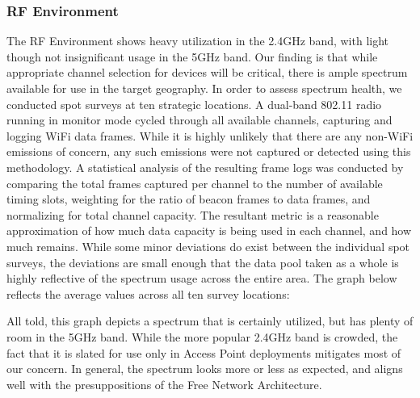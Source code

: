 \subsubsection{RF Environment}
The RF Environment shows heavy utilization in the 2.4GHz band, with light though
not insignificant usage in the 5GHz band. Our finding is that while appropriate
channel selection for devices will be critical, there is ample spectrum
available for use in the target geography. In order to assess spectrum health,
we conducted spot surveys at ten strategic locations. A dual-band 802.11 radio
running in monitor mode cycled through all available channels, capturing and
logging WiFi data frames. While it is highly unlikely that there are any non-WiFi
emissions of concern, any such emissions were not captured or detected using
this methodology. A statistical analysis of the resulting frame logs was conducted
by comparing the total frames captured per channel to the number of available
timing slots, weighting for the ratio of beacon frames to data frames, and
normalizing for total channel capacity. The resultant metric is a reasonable
approximation of how much data capacity is being used in each channel, and how
much remains. While some minor deviations do exist
between the individual spot surveys, the deviations are small enough that the
data pool taken as a whole is highly reflective of the spectrum usage across
the entire area. The graph below reflects the average values across all ten
survey locations: \par
\begin{center}
\end{center}
All told, this graph depicts a spectrum that is certainly utilized, but has plenty of room
in the 5GHz band. While the more popular 2.4GHz band is crowded, the fact that
it is slated for use only in Access Point deployments mitigates most of our
concern. In general, the spectrum looks more or less as expected, and aligns
well with the presuppositions of the Free Network Architecture.

